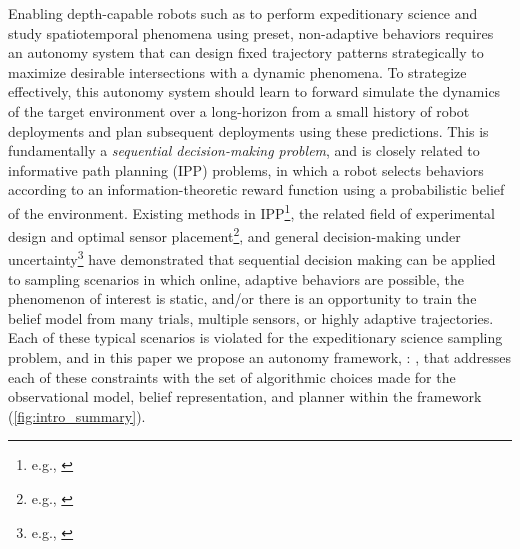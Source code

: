 Enabling depth-capable robots such as \Sentry to perform expeditionary science and study spatiotemporal phenomena using preset, non-adaptive behaviors requires an autonomy system that can design fixed trajectory patterns strategically to maximize desirable intersections with a dynamic phenomena. To strategize effectively, this autonomy system should learn to forward simulate the dynamics of the target environment over a long-horizon from a small history of robot deployments and plan subsequent deployments using these predictions. This is fundamentally a \emph{sequential decision-making problem}, and is closely related to informative path planning (IPP) problems, in which a robot selects behaviors according to an information-theoretic reward function using a probabilistic belief of the environment. Existing methods in IPP\footnote{e.g., \autocite{Hitz2017,hollinger2013sampling,flaspohler2019information,levine2010information,binney2012branch}}, the related field of experimental design and optimal sensor placement\footnote{e.g., \autocite{krause2008near,wang2019reinforcement}}, and general decision-making under uncertainty\footnote{e.g., \autocite{sunberg2018online, somani2013despot,kocsis2006bandit,Silver2010}} have demonstrated that sequential decision making can be applied to sampling scenarios in which online, adaptive behaviors are possible, the phenomenon of interest is static, and/or there is an opportunity to train the belief model from many trials, multiple sensors, or highly adaptive trajectories. Each of these typical scenarios is violated for the expeditionary science sampling problem, and in this paper we propose an autonomy framework, \PHORTEX: \phortex, that addresses each of these constraints with the set of algorithmic choices made for the observational model, belief representation, and planner within the framework (\cref{fig:intro_summary}). 


